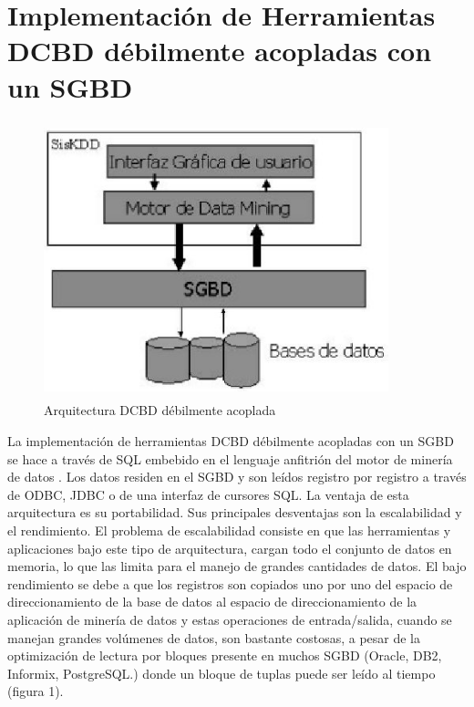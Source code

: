\section{Implementaci\'on de  Herramientas DCBD d\'ebilmente acopladas con un SGBD}
\begin{figure}[h]
   \centering
   \includegraphics[width=10cm,height=8cm]{imgsMteorico/arquitectura.jpg}
   \caption{Arquitectura DCBD d\'ebilmente acoplada}
   \label{fig1}
\end{figure}

La implementaci\'on de herramientas DCBD d\'ebilmente acopladas con un SGBD se hace a
trav\'es de SQL embebido en
el lenguaje anfitri\'on del motor de miner\'ia de datos \cite{3}.  Los datos residen en
el SGBD y son le\'idos
registro por registro a trav\'es de ODBC, JDBC o de una interfaz  de cursores SQL. La
ventaja de esta arquitectura
es su portabilidad. Sus principales desventajas son la escalabilidad y el rendimiento. El
problema de
escalabilidad consiste en que las herramientas y aplicaciones bajo este tipo de
arquitectura,  cargan todo el
conjunto de datos en memoria, lo que las limita para el manejo de grandes cantidades de
datos. El bajo rendimiento
se debe a que los registros son copiados uno por uno  del espacio de direccionamiento de
la base de datos al
espacio de direccionamiento de la aplicaci\'on de miner\'ia de datos \cite{6,15}  y
estas  operaciones de
entrada/salida,  cuando se manejan grandes vol\'umenes de datos,  son bastante costosas,
a pesar de la
optimizaci\'on de lectura por bloques presente en muchos SGBD (Oracle, DB2, Informix,
PostgreSQL.) donde un bloque
de tuplas puede ser le\'ido al tiempo (figura 1).

